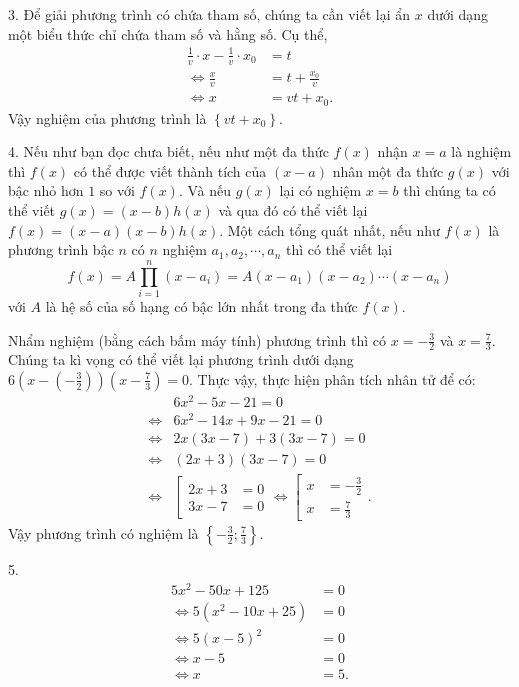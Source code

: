3. Để giải phương trình có chứa tham số, chúng ta cần viết lại ẩn $x$ dưới dạng một biểu thức chỉ chứa tham số và hằng số. Cụ thể,
\begin{align*}
   \frac{1}{v}\cdot x - \frac{1}{v} \cdot x_0 &= t \\
   \iff \frac{x}{v} &= t + \frac{x_0}{v} \\
   \iff x &= vt + x_0.
\end{align*}
Vậy nghiệm của phương trình là $\displaystyle\left\{vt + x_0\right\}$.

4. Nếu như bạn đọc chưa biết, nếu như một đa thức $f(x)$ nhận $x = a$ là nghiệm thì $f(x)$ có thể được viết thành tích của $(x - a)$ nhân một đa thức $g(x)$ với bậc nhỏ hơn $1$ so với $f(x)$. Và nếu $g(x)$ lại có nghiệm $x = b$ thì chúng ta có thể viết $g(x) = (x-b)h(x)$ và qua đó có thể viết lại $f(x) = (x-a)(x-b)h(x)$. Một cách tổng quát nhất, nếu như $f(x)$ là phương trình bậc $n$ có $n$ nghiệm $a_1, a_2, \cdots, a_n$ thì có thể viết lại $$f(x) = A \prod_{i=1}^{n} (x - a_i) = A(x - a_1)(x - a_2)\cdots (x - a_n)$$ với $A$ là hệ số của số hạng có bậc lớn nhất trong đa thức $f(x)$.

Nhẩm nghiệm (bằng cách bấm máy tính) phương trình thì có $x = -\frac{3}{2}$ và $x = \frac{7}{3}$. Chúng ta kì vọng có thể viết lại phương trình dưới dạng $6\left(x - \left(-\frac{3}{2}\right)\right)\left(x - \frac{7}{3}\right) = 0$. Thực vậy, thực hiện phân tích nhân tử để có:
\begin{align*}
   &6x^2 - 5x - 21 = 0 \\
   \iff &6x^2 - 14x + 9x - 21 = 0 \\
   \iff &2x(3x - 7) + 3(3x - 7) = 0 \\
   \iff &(2x + 3)(3x - 7) = 0 \\
   \iff &\left[
      \begin{aligned}
         2x + 3 &= 0 \\
         3x - 7 &= 0
      \end{aligned}
   \right.
   \iff \left[
      \begin{aligned}
         x &= -\frac{3}{2} \\
         x &= \frac{7}{3}
      \end{aligned}
   \right..
\end{align*}
Vậy phương trình có nghiệm là $\displaystyle\left\{-\frac{3}{2}; \frac{7}{3}\right\}$.

5.
\begin{align*}
   5x^2 - 50x + 125 &= 0 \\
   \iff 5\left(x^2 - 10x + 25\right) &= 0 \\
   \iff 5(x - 5)^2 &= 0 \\
   \iff x - 5 &= 0 \\
   \iff x &= 5.
\end{align*}

